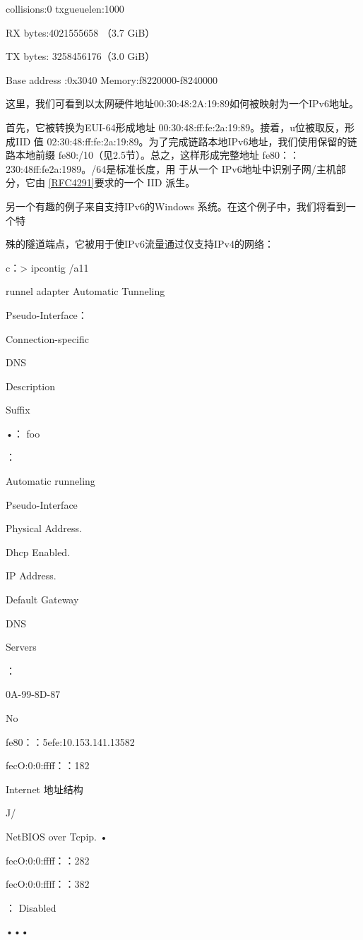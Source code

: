 collisions:0 txgueuelen:1000

RX bytes:4021555658 （3.7 GiB）

TX bytes: 3258456176（3.0 GiB）

Base address :0x3040 Memory:f8220000-f8240000

这里，我们可看到以太网硬件地址00:30:48:2A:19:89如何被映射为一个IPv6地址。

首先，它被转换为EUI-64形成地址 00:30:48:ff:fe:2a:19:89。接着，u位被取反，形成IID
值 02:30:48:ff:fe:2a:19:89。为了完成链路本地IPv6地址，我们使用保留的链路本地前缀
fe80:/10（见2.5节）。总之，这样形成完整地址 fe80：：230:48ff:fe2a:1989。/64是标准长度，用
于从一个 IPv6地址中识别子网/主机部分，它由 \href{https://www.rfc-editor.org/rfc/rfc4291}{[RFC4291]}要求的一个 IID 派生。

另一个有趣的例子来自支持IPv6的Windows 系统。在这个例子中，我们将看到一个特

殊的隧道端点，它被用于使IPv6流量通过仅支持IPv4的网络：

c：> ipcontig /a11

runnel adapter Automatic Tunneling

Pseudo-Interface：

Connection-specific

DNS

Description

Suffix

•： foo

：

Automatic runneling

Pseudo-Interface

Physical Address.

Dhcp Enabled.

IP Address.

Default Gateway

DNS

Servers

：

0A-99-8D-87

No

fe80：：5efe:10.153.141.13582

fecO:0:0:ffff：：182

Internet 地址结构

J/

NetBIOS over Tcpip. •

fecO:0:0:ffff：：282

fecO:0:0:ffff：：382

： Disabled

•••

